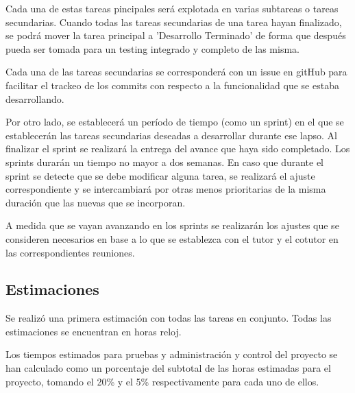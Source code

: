 \documentclass[a4paper]{article}
\begin{document}
Cada una de estas tareas pincipales será explotada en varias subtareas o tareas secundarias. Cuando todas las tareas secundarias de una tarea hayan finalizado, se podrá mover la tarea principal a 'Desarrollo Terminado' de forma que después pueda ser tomada para un testing integrado y completo de las misma.

Cada una de las tareas secundarias se corresponderá con un issue en gitHub para facilitar el trackeo de los commits con respecto a la funcionalidad que se estaba desarrollando.

Por otro lado, se establecerá un período de tiempo (como un sprint) en el que se establecerán las tareas secundarias deseadas a desarrollar durante ese lapso. Al finalizar el sprint se realizará la entrega del avance que haya sido completado. Los sprints durarán un tiempo no mayor a dos semanas. En caso que durante el sprint se detecte que se debe modificar alguna tarea, se realizará el ajuste correspondiente y se intercambiará por otras menos prioritarias de la misma duración que las nuevas que se incorporan.

A medida que se vayan avanzando en los sprints se realizarán los ajustes que se consideren necesarios en base a lo que se establezca con el tutor y el cotutor en las correspondientes reuniones.

\subsection{Estimaciones}

Se realizó una primera estimación con todas las tareas en conjunto. Todas las estimaciones se encuentran en horas reloj.

Los tiempos estimados para pruebas y administración y control del proyecto se han calculado como un porcentaje del subtotal de las horas estimadas para el proyecto, tomando el 20\% y el 5\% respectivamente para cada uno de ellos.
\end{document}

